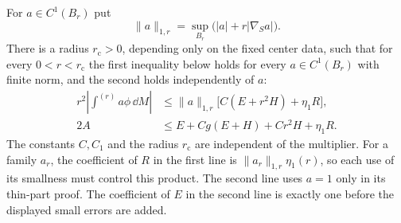 \begin{lemma}\label{in:collar}
For $a\in C^1(B_r)$ put
\[
 \|a\|_{1,r}=\sup_{B_r}\bigl(|a|+r|\nabla_Sa|\bigr).
\]
There is a radius $r_{\mathrm c}>0$, depending only on the fixed center
data, such that for every $0<r<r_{\mathrm c}$ the first inequality below
holds for every $a\in C^1(B_r)$ with finite norm, and the second holds
independently of $a$:
\begin{equation}\label{in:collarestimates}
 \begin{split}
 r^2\left|\int^{(r)}a\phi\,\dd M\right|
   &\leq \|a\|_{1,r}\bigl[C(E+r^2H)+\eta_1 R\bigr],\\
 2A&\leq E+Cg(E+H)+Cr^2H+\eta_1 R.
 \end{split}
\end{equation}
The constants $C,C_1$ and the radius $r_{\mathrm c}$ are independent of
the multiplier.  For a family $a_r$, the coefficient of $R$ in the first
line is $\|a_r\|_{1,r}\eta_1(r)$, so each use of its smallness must
control this product.  The second line uses $a=1$ only in its thin-part
proof.
The coefficient of $E$ in the second line is exactly one before the
displayed small errors are added.
\end{lemma}

